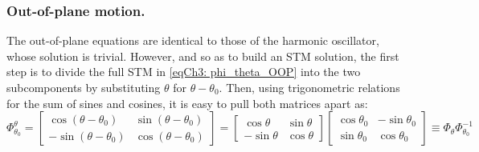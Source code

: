 		\subsubsection{Out-of-plane motion.}
		\indent The out-of-plane equations are identical to those of the harmonic oscillator, whose solution is trivial. However, and so as to build an STM solution, the first step is to divide the full STM in \eqref{eqCh3: phi_theta_OOP} into the two subcomponents by substituting $\theta$ for $\theta - \theta_0$. Then, using trigonometric relations for the sum of sines and cosines, it is easy to pull both matrices apart as:
		\begin{equation}
		\Phi_{\theta_0}^{\theta} = 
		\left[ 
		\begin{array}{cccc}
		\cos(\theta - \theta_0) & \sin(\theta - \theta_0) \\
		-\sin(\theta - \theta_0) & \cos(\theta - \theta_0)
		\end{array}
		\right] = 
		\left[ 
		\begin{array}{cccc}
		\cos\theta & \sin\theta  \\
		-\sin\theta & \cos\theta 
		\end{array}
		\right]
		\left[ 
		\begin{array}{cccc}
		\cos\theta_0 & -\sin\theta_0  \\
		\sin\theta_0 & \cos\theta_0
		\end{array}
		\right]
		\equiv 
		\Phi_{\theta} \Phi_{\theta_0}^{-1}
		\label{eqCh3:phi_OOP}
		\end{equation}
		\clearpage
